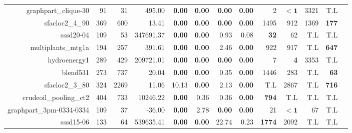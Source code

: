 \begin{landscape}
\begin{table*}[t]
\begin{tabular}{|r|r|r||r||r|r|r|r||r|r|r|r|r|}
                graphpart\_clique-30 &            91 &            31 &                            495.00 &  \textbf{0.00} &  \textbf{0.00} &  \textbf{0.00} &  \textbf{0.00} &                  2 &         $\bm{< 1}$ &               3321 &                T.L \\ 
                     sfacloc2\_4\_90 &           369 &           600 &                             13.41 &  \textbf{0.00} &  \textbf{0.00} &  \textbf{0.00} &  \textbf{0.00} &               1495 &                912 &               1369 &       \textbf{177} \\ 
                           sssd20-04 &           109 &            53 &                         347691.37 &  \textbf{0.00} &  \textbf{0.00} &           0.93 &           0.08 &        \textbf{32} &                 62 &                T.L &                T.L \\ 
                  multiplants\_mtg1a &           194 &           257 &                            391.61 &  \textbf{0.00} &  \textbf{0.00} &           2.46 &  \textbf{0.00} &                922 &                917 &                T.L &       \textbf{647} \\ 
                        hydroenergy1 &           289 &           429 &                         209721.01 &  \textbf{0.00} &  \textbf{0.00} &  \textbf{0.00} &  \textbf{0.00} &                  7 &         \textbf{4} &               3353 &                T.L \\ 
                            blend531 &           273 &           737 &                             20.04 &  \textbf{0.00} &  \textbf{0.00} &           0.35 &  \textbf{0.00} &               1446 &                283 &                T.L &        \textbf{63} \\ 
                     sfacloc2\_3\_80 &           324 &          2269 &                             11.06 &          10.13 &  \textbf{0.00} &           2.13 &  \textbf{0.00} &                T.L &               2867 &                T.L &       \textbf{716} \\ 
              crudeoil\_pooling\_ct2 &           404 &           733 &                          10246.22 &  \textbf{0.00} &           0.36 &           0.36 &  \textbf{0.00} &       \textbf{794} &                T.L &                T.L &                T.L \\ 
            graphpart\_3pm-0334-0334 &           109 &            37 &                            -36.00 &  \textbf{0.00} &           2.78 &  \textbf{0.00} &  \textbf{0.00} &                 21 &         $\bm{< 1}$ &                 67 &                T.L \\ 
                           sssd15-06 &           133 &            64 &                         539635.41 &  \textbf{0.00} &  \textbf{0.00} &          22.74 &           0.23 &      \textbf{1774} &               2092 &                T.L &                T.L \\ 
\hline 
\end{tabular}\\ 
\end{table*} 
\end{landscape} 
